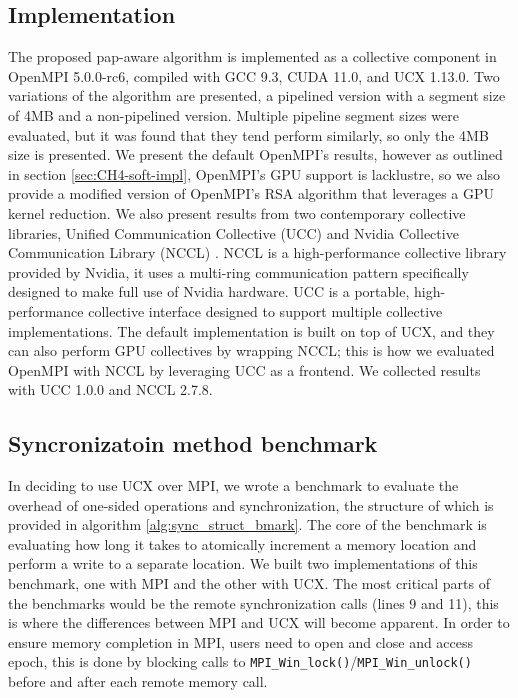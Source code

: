 \subsection{Implementation}
The proposed pap-aware algorithm is implemented as a collective component in OpenMPI 5.0.0-rc6, compiled with GCC 9.3, CUDA 11.0, and UCX 1.13.0. 
Two variations of the algorithm are presented, a pipelined version with a segment size of 4MB and a non-pipelined version.
Multiple pipeline segment sizes were evaluated, but it was found that they tend perform similarly, so only the 4MB size is presented.
We present the default OpenMPI's results, however as outlined in section \ref{sec:CH4-soft-impl}, OpenMPI's GPU support is lacklustre, so we also provide a modified version of OpenMPI's RSA algorithm that leverages a GPU kernel reduction. 
We also present results from two contemporary collective libraries, Unified Communication Collective (UCC) \cite{UCC} and Nvidia Collective Communication Library (NCCL) \cite{NCCL}.
NCCL is a high-performance collective library provided by Nvidia, it uses a multi-ring communication pattern specifically designed to make full use of Nvidia hardware.
UCC is a portable, high-performance collective interface designed to support multiple collective implementations.
The default implementation is built on top of UCX, and they can also perform GPU collectives by wrapping NCCL; this is how we evaluated OpenMPI with NCCL by leveraging UCC as a frontend.
We collected results with UCC 1.0.0 and NCCL 2.7.8.

\subsection{Syncronizatoin method benchmark}
In deciding to use UCX over MPI, we wrote a benchmark to evaluate the overhead of one-sided operations and synchronization, the structure of which is provided in algorithm \ref{alg:sync_struct_bmark}.
The core of the benchmark is evaluating how long it takes to atomically increment a memory location and perform a write to a separate location.
We built two implementations of this benchmark, one with MPI and the other with UCX. 
The most critical parts of the benchmarks would be the remote synchronization calls (lines 9 and 11), this is where the differences between MPI and UCX will become apparent.  
In order to ensure memory completion in MPI, users need to open and close and access epoch, this is done by blocking calls to \texttt{MPI\_Win\_lock()}/\texttt{MPI\_Win\_unlock()} before and after each remote memory call.

